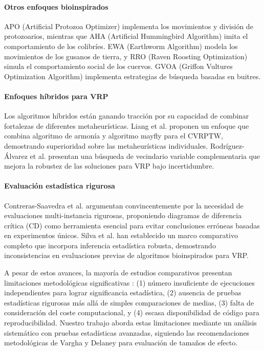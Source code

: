 \documentclass[conference,a4paper]{IEEEtran}
\begin{document}
\paragraph{Otros enfoques bioinspirados} APO (Artificial Protozoa Optimizer) \cite{Wang2024APO} implementa los movimientos y división de protozoarios, mientras que AHA (Artificial Hummingbird Algorithm) \cite{Zhao2022AHA} imita el comportamiento de los colibríes. EWA (Earthworm Algorithm) \cite{Wang2018EWA} modela los movimientos de los gusanos de tierra, y RRO (Raven Roosting Optimization) \cite{Brabazon2016RRO} simula el comportamiento social de los cuervos. GVOA (Griffon Vultures Optimization Algorithm) \cite{Hasan2025GVOA} implementa estrategias de búsqueda basadas en buitres.

\paragraph{Enfoques híbridos para VRP} Los algoritmos híbridos están ganando tracción por su capacidad de combinar fortalezas de diferentes metaheurísticas. Liang et al. \cite{Liang2023HHMM} proponen un enfoque que combina algoritmo de armonía y algoritmo mayfly para el CVRPTW, demostrando superioridad sobre las metaheurísticas individuales. Rodríguez-Álvarez et al. \cite{Rodriguez2024CSVNS} presentan una búsqueda de vecindario variable complementaria que mejora la robustez de las soluciones para VRP bajo incertidumbre.

\paragraph{Evaluación estadística rigurosa} Contreras-Saavedra et al. \cite{Contreras2024CD} argumentan convincentemente por la necesidad de evaluaciones multi-instancia rigurosas, proponiendo diagramas de diferencia crítica (CD) como herramienta esencial para evitar conclusiones erróneas basadas en experimentos únicos. Silva et al. \cite{Silva2023VRP} han establecido un marco comparativo completo que incorpora inferencia estadística robusta, demostrando inconsistencias en evaluaciones previas de algoritmos bioinspirados para VRP.

A pesar de estos avances, la mayoría de estudios comparativos presentan limitaciones metodológicas significativas \cite{Li2020SMA}: (1) número insuficiente de ejecuciones independientes para lograr significancia estadística, (2) ausencia de pruebas estadísticas rigurosas más allá de simples comparaciones de medias, (3) falta de consideración del coste computacional, y (4) escasa disponibilidad de código para reproducibilidad. Nuestro trabajo aborda estas limitaciones mediante un análisis sistemático con pruebas estadísticas avanzadas, siguiendo las recomendaciones metodológicas de Vargha y Delaney \cite{Vargha2000} para evaluación de tamaños de efecto.
\end{document}
